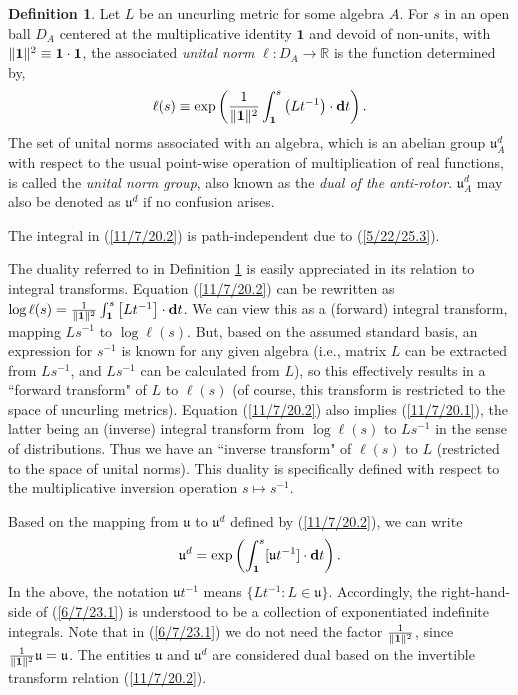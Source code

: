 \documentclass{amsart}
\theoremstyle{definition}
\newtheorem{definition}[theorem]{Definition}
\numberwithin{theorem}{section}
\numberwithin{equation}{section}
\begin{document}
   \begin{definition}\label{9/21/23.2} Let $L$ be an uncurling metric for some algebra $A$.  For $s$ in an open ball $D_A$ centered at the multiplicative identity $\mathbf{1}$ and devoid of non-units, with $\|{\bf 1}\|^2 \equiv \mathbf{1}\cdot\mathbf{1}$, the associated {\it unital norm} $ \ell:D_A\rightarrow \mathbb{R}$ is the function determined by, 
  \begin{equation}\label{11/7/20.2} \ell(s) \equiv \exp\left(\frac{1}{\|{\bf 1}\|^2}\int_{\bf 1}^s \left(Lt^{-1}\right)\cdot \mathbf{d}t\right).\end{equation} 
   The set of unital norms associated with an algebra, which is an abelian group $\mathfrak{u}^d_A$ with respect to the usual point-wise operation of multiplication of real functions, is called the {\it unital norm group}, also known as the {\it dual of the anti-rotor}. $\mathfrak{u}^d_A$ may also be denoted as $\mathfrak{u}^d$ if no confusion arises.  
   \end{definition} 
   
The integral in (\ref{11/7/20.2}) is path-independent due to (\ref{5/22/25.3}).  

The duality referred to in Definition \ref{9/21/23.2} is easily appreciated in its relation to integral transforms.  Equation (\ref{11/7/20.2}) can be rewritten as  \mbox{$\log\ell(s) = \frac{1}{\|\mathbf{1}\|^2}\int_{{\bf 1}}^{s} \left[L t^{-1}\right]\cdot \mathbf{d}t$.}   We can view this as a (forward) integral transform, mapping $Ls^{-1}$ to $\log \ell(s)$.  But, based on the assumed standard basis, an expression for $s^{-1}$ is known for any given algebra (i.e., matrix $L$ can be extracted from $Ls^{-1}$, and $Ls^{-1}$ can be calculated from $L$), so this effectively results in a ``forward transform" of $L$ to $\ell(s)$ (of course, this transform is restricted to the space of uncurling metrics).    Equation (\ref{11/7/20.2}) also implies (\ref{11/7/20.1}), the latter being an (inverse) integral transform from $\log \ell(s)$ to $Ls^{-1}$ in the sense of distributions.  Thus we have an ``inverse transform" of $\ell(s)$ to $L$ (restricted to the space of unital norms).
This duality is specifically defined with respect to the multiplicative inversion operation $s\mapsto s^{-1}$.
  
 
 Based on the mapping from $\mathfrak{u}$ to $\mathfrak{u}^d$ defined by (\ref{11/7/20.2}),  we can write \begin{equation}  \mathfrak{u}^d = \exp\left(\int_{\bf 1}^s [\mathfrak{u}t^{-1}]\cdot \mathbf{d}t\right). \label{6/7/23.1}\end{equation}  
 In the above, the notation $\mathfrak{u}t^{-1}$ means $\{Lt^{-1}: L\in \mathfrak{u}\}$.  Accordingly, the right-hand-side of (\ref{6/7/23.1}) is understood to be a collection of exponentiated indefinite integrals.   Note that in (\ref{6/7/23.1}) we do not need the factor $\frac{1}{\|{\bf 1}\|^2}$, since $\frac{1}{\|{\bf 1}\|^2}\mathfrak{u}=\mathfrak{u}$.  The entities  $\mathfrak{u}$ and $\mathfrak{u}^d$ are considered dual based on the invertible transform relation (\ref{11/7/20.2}).
  
\end{document}
